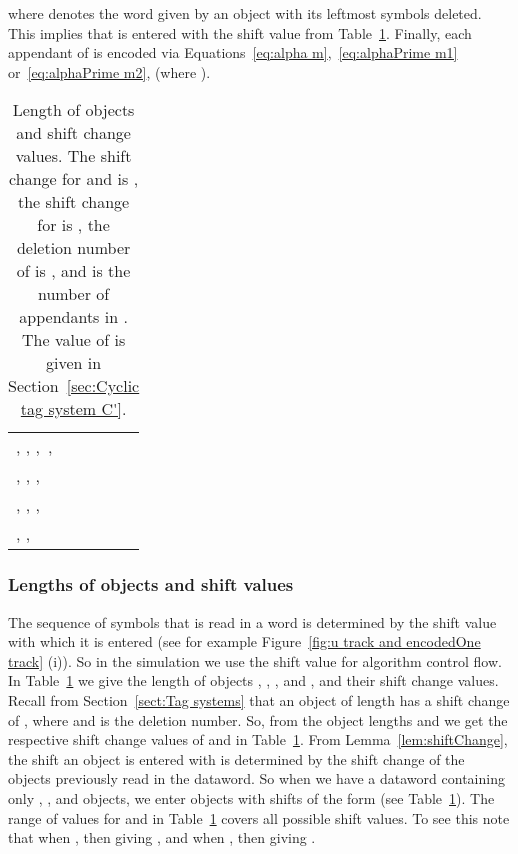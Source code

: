 \documentclass[11pt]{article} \usepackage{amsfonts,amsmath,amssymb,amsthm}
\begin{document}
where  denotes the word given by an object  with its leftmost  symbols deleted. This implies that  is entered with the shift value  from Table~\ref{tab:equalities}. Finally, each appendant  of  is encoded via Equations~\eqref{eq:alpha m},~\eqref{eq:alphaPrime m1} or~\eqref{eq:alphaPrime m2}, (where ).\\
\begin{minipage}{.4\textwidth}
 
\end{minipage}
\begin{minipage}{.59\textwidth}

\end{minipage}





\begin{table}
\centering
\begin{tabular}{|@{\:}l@{}|}
\hline
,\quad\;\; ,\quad\;\; ,\quad\;\,  ,
\\  
,\qquad\;
,\qquad\; ,\quad\\ 
,\qquad\;  
,\qquad\; ,\\
,\qquad\; ,\qquad\; \\
\hline
\end{tabular}
\caption{Length of objects and shift change values. The shift change for  and  is , the shift change for  is , the deletion number of  is , and  is the number of appendants in . The value of  is given in Section~\ref{sec:Cyclic tag system C'}.}\label{tab:equalities}
\end{table}




\subsubsection{Lengths of objects and shift values}\label{sec:length of objects}
The sequence of symbols that is read in a word is determined by the shift value with which it is entered (see for example Figure~\ref{fig:u track and encodedOne track} (i)).
So in the simulation we use the shift value for algorithm control flow. 
In Table~\ref{tab:equalities} we give the length of objects , , , and , and their shift change values.
Recall from Section~\ref{sect:Tag systems} that an object of length  has a shift change of , where  and  is the deletion number. 
So, from the object lengths  and  we get the respective shift change values of  and  in Table~\ref{tab:equalities}.
From Lemma~\ref{lem:shiftChange}, the shift an object is entered with is determined by the shift change of the objects previously read in the dataword. 
So when we have a dataword containing only , ,  and  objects, we enter objects with shifts of the form  (see Table~\ref{tab:equalities}). 
The range of values for  and  in Table~\ref{tab:equalities} covers all possible shift values. 
To see this note that when , then   giving , and when , then  giving .
\end{document}
